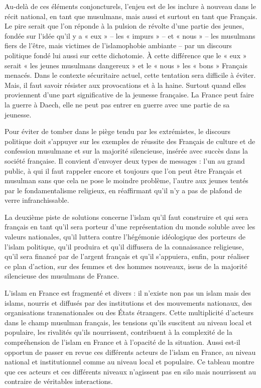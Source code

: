 Au-delà de ces éléments conjoncturels, l'enjeu est de les inclure à
nouveau dans le récit national, en tant que musulmans, mais aussi et
surtout en tant que Français. Le pire serait que l'on réponde à la
pulsion de révolte d'une partie des jeunes, fondée sur l'idée qu'il y a
« eux » -- les « impurs » -- et « nous » -- les musulmans fiers de
l'être, mais victimes de l'islamophobie ambiante -- par un discours
politique fondé lui aussi sur cette dichotomie. À cette différence que
le « eux » serait « les jeunes musulmans dangereux » et le « nous » les
« bons » Français menacés. Dans le contexte sécuritaire actuel, cette
tentation sera difficile à éviter. Mais, il faut savoir résister aux
provocations et à la haine. Surtout quand elles proviennent d'une part
significative de la jeunesse française. La France peut faire la guerre à
Daech, elle ne peut pas entrer en guerre avec une partie de sa jeunesse.

Pour éviter de tomber dans le piège tendu par les extrémistes, le
discours politique doit s'appuyer sur les exemples de réussite des
Français de culture et de confession musulmane et sur la majorité
silencieuse, insérée avec succès dans la société française. Il convient
d'envoyer deux types de messages : l'un au grand public, à qui il faut
rappeler encore et toujours que l'on peut être Français et musulman sans
que cela ne pose le moindre problème, l'autre aux jeunes tentés par le
fondamentalisme religieux, en réaffirmant qu'il n'y a pas de plafond de
verre infranchissable.

La deuxième piste de solutions concerne l'islam qu'il faut construire et
qui sera français en tant qu'il sera porteur d'une représentation du
monde soluble avec les valeurs nationales, qu'il luttera contre
l'hégémonie idéologique des porteurs de l'islam politique, qu'il
produira et qu'il diffusera de la connaissance religieuse, qu'il sera
financé par de l'argent français et qu'il s'appuiera, enfin, pour
réaliser ce plan d'action, sur des femmes et des hommes nouveaux, issus
de la majorité silencieuse des musulmans de France.

L'islam en France est fragmenté et divers : il n'existe non pas un islam
mais des islams, nourris et diffusés par des institutions et des
mouvements nationaux, des organisations transnationales ou des États
étrangers. Cette multiplicité d'acteurs dans le champ musulman français,
les tensions qu'ils suscitent au niveau local et populaire, les
rivalités qu'ils nourrissent, contribuent à la complexité de la
compréhension de l'islam en France et à l'opacité de la situation. Aussi
est-il opportun de passer en revue ces différents acteurs de l'islam en
France, au niveau national et institutionnel comme au niveau local et
populaire. Ce tableau montre que ces acteurs et ces différents niveaux
n'agissent pas en silo mais nourrissent au contraire de véritables
interactions.


